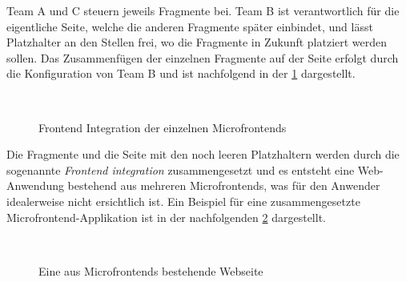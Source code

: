 Team A und C steuern jeweils Fragmente bei. Team B ist verantwortlich für die eigentliche Seite, welche die anderen Fragmente später einbindet, und lässt Platzhalter an den Stellen frei, wo die Fragmente in Zukunft platziert werden sollen. Das Zusammenfügen der einzelnen Fragmente auf der Seite erfolgt durch die Konfiguration von Team B und ist nachfolgend in der \cref{fig:frontendintegration} dargestellt.

\newpage 
\begin{figure}[hbt!]
	\centering
	\begin{minipage}[t]{0.8\textwidth}	
		\caption{Frontend Integration der einzelnen Microfrontends}
		\\ %
		\label{fig:frontendintegration}
	\end{minipage}
\end{figure}

Die Fragmente und die Seite mit den noch leeren Platzhaltern werden durch die sogenannte \textit{Frontend integration} zusammengesetzt und es entsteht eine Web-Anwendung bestehend aus mehreren Microfrontends, was für den Anwender idealerweise nicht ersichtlich ist. Ein Beispiel für eine zusammengesetzte Microfrontend-Applikation ist in der nachfolgenden \cref{fig:TractorStoreMicrofrontend} dargestellt.

\begin{figure}[hbt!]
	\centering
	\begin{minipage}[t]{0.8\textwidth}	
		\caption{Eine aus Microfrontends bestehende Webseite}
		\\ %
		\label{fig:TractorStoreMicrofrontend}
	\end{minipage}
\end{figure}

